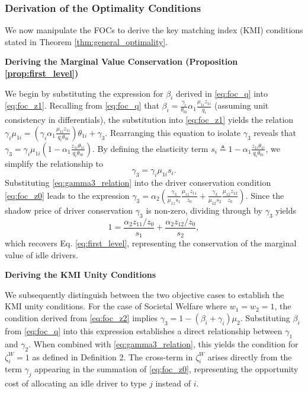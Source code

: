 \subsubsection{Derivation of the Optimality Conditions}
We now manipulate the FOCs to derive the key matching index (KMI) conditions stated in Theorem \ref{thm:general_optimality}.

\textbf{Deriving the Marginal Value Conservation (Proposition \ref{prop:first_level})}

We begin by substituting the expression for $\beta_i$ derived in \eqref{eq:foc_q} into \eqref{eq:foc_z1}.
Recalling from \eqref{eq:foc_q} that $\beta_i = \frac{\gamma_i}{\theta_{0i}} \alpha_1 \frac{\mu_{1i} z_{1i}}{q_i}$ (assuming unit consistency in differentials), the substitution into \eqref{eq:foc_z1} yields the relation $\gamma_i\mu_{1i}=  \left( \gamma_i \alpha_1 \frac{\mu_{1i}z_{1i}}{q_i\theta_{0i}} \right)\theta_{1i} + \gamma_3$.
Rearranging this equation to isolate $\gamma_3$ reveals that $\gamma_3  = \gamma_i\mu_{1i} \left( 1 - \alpha_1 \frac{z_{1i} \theta_{1i}}{q_i \theta_{0i}} \right)$.
By defining the elasticity term $s_i \triangleq 1 - \alpha_1 \frac{z_{1i} \theta_{1i}}{q_i \theta_{0i}}$, we simplify the relationship to
\begin{equation}
    \gamma_3 = \gamma_i \mu_{1i} s_i. \label{eq:gamma3_relation}
\end{equation}
Substituting \eqref{eq:gamma3_relation} into the driver conservation condition \eqref{eq:foc_z0} leads to the expression $\gamma_3 = \alpha_2 \left( \frac{\gamma_3}{\mu_{11} s_1} \frac{\mu_{11} z_{11}}{z_0} + \frac{\gamma_3}{\mu_{12} s_2} \frac{\mu_{12} z_{12}}{z_0} \right)$.
Since the shadow price of driver conservation $\gamma_3$ is non-zero, dividing through by $\gamma_3$ yields
\begin{equation}
    1 = \frac{\alpha_2 z_{11}/z_0}{s_1} + \frac{\alpha_2 z_{12}/z_0}{s_2},
\end{equation}
which recovers Eq. \eqref{eq:first_level}, representing the conservation of the marginal value of idle drivers.

\textbf{Deriving the KMI Unity Conditions}

We subsequently distinguish between the two objective cases to establish the KMI unity conditions.
For the case of Societal Welfare where $w_1=w_2=1$, the condition derived from \eqref{eq:foc_z2} implies $\gamma_3 = 1 - (\beta_i + \gamma_i)\mu_2$.
Substituting $\beta_i$ from \eqref{eq:foc_q} into this expression establishes a direct relationship between $\gamma_1$ and $\gamma_2$.
When combined with \eqref{eq:gamma3_relation}, this yields the condition for $\zeta_i^W = 1$ as defined in Definition 2.
The cross-term in $\zeta_i^W$ arises directly from the term $\gamma_j$ appearing in the summation of \eqref{eq:foc_z0}, representing the opportunity cost of allocating an idle driver to type $j$ instead of $i$.

